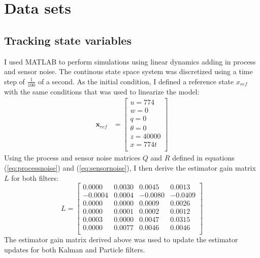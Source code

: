 \section{Data sets} \label{sec:data}


\subsection{Tracking state variables}

I used MATLAB to perform simulations using linear dynamics adding in
process and sensor noise. The continous state space system was 
discretized using a time step of $\frac{1}{100}$ of a second. As the
initial condition, I defined a reference state $x_{ref}$ with the
same conditions that was used to linearize the model:
\begin{align}
  \mathbf{x}_{ref} &=
  \begin{bmatrix}
    u = 774 \\
    w = 0 \\
    q = 0 \\
    \theta = 0 \\
    z = 40000 \\
    x = 774t\\
  \end{bmatrix}
\end{align}
Using the process and sensor noise matrices $Q$ and $R$ defined
in equations (\ref{eq:processnoise}) and (\ref{eq:sensornoise}), I
then derive the estimator gain matrix $L$ for both filters:
\begin{equation} \label{eq:estgain}
  L =
  \begin{bmatrix}  
    0.0000  &  0.0030 &   0.0045  &   0.0013 \\
    -0.0004  &  0.0004 &  -0.0080  &  -0.0409\\
    0.0000  &  0.0000 &   0.0009  &  0.0026\\
    0.0000  &  0.0001 &   0.0002  &  0.0012 \\
    0.0003  &  0.0000 &   0.0047  &  0.0315 \\
    0.0000  &  0.0077 &   0.0046  &  0.0046 \\
  \end{bmatrix} 
\end{equation}
The estimator gain matrix derived above was used to update the
estimator updates for both Kalman and Particle filters.

